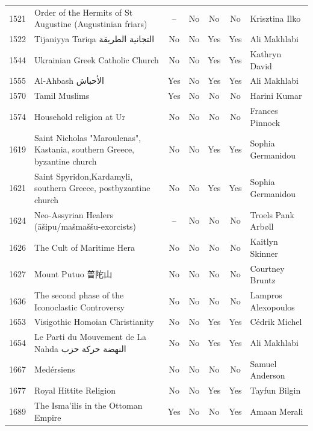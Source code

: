 {\begin{longtable}{rp{3.5cm}ccccp{3cm}}
1521 & {\raggedright Order of the Hermits of St Augustine (Augustinian friars)} & -- & No & No & No & {\raggedright Krisztina Ilko} \\
1522 & {\raggedright Tijaniyya Tariqa {\arabicfont التجانية الطريقة}} & No & No & Yes & Yes & {\raggedright Ali Makhlabi} \\
1544 & {\raggedright Ukrainian Greek Catholic Church} & No & No & Yes & Yes & {\raggedright Kathryn David} \\
1555 & {\raggedright Al-Ahbash {\arabicfont الأحباش}} & Yes & No & Yes & Yes & {\raggedright Ali Makhlabi} \\
1570 & {\raggedright Tamil Muslims} & Yes & No & No & No & {\raggedright Harini Kumar} \\
1574 & {\raggedright Household religion at Ur} & No & No & No & No & {\raggedright Frances Pinnock} \\
1619 & {\raggedright Saint Nicholas "Maroulenas", Kastania, southern Greece, byzantine church} & No & No & Yes & Yes & {\raggedright Sophia Germanidou} \\
1621 & {\raggedright Saint Spyridon,Kardamyli, southern Greece, postbyzantine church} & No & No & Yes & Yes & {\raggedright Sophia Germanidou} \\
1624 & {\raggedright Neo-Assyrian Healers (āšipu/mašmaššu-exorcists)} & -- & No & No & No & {\raggedright Troels Pank Arbøll} \\
1626 & {\raggedright The Cult of Maritime Hera} & No & No & No & No & {\raggedright Kaitlyn Skinner} \\
1627 & {\raggedright Mount Putuo 普陀山} & No & No & No & No & {\raggedright Courtney Bruntz} \\
1636 & {\raggedright The second phase of the Iconoclastic Controversy} & No & No & No & No & {\raggedright Lampros Alexopoulos} \\
1653 & {\raggedright Visigothic Homoian Christianity} & No & No & Yes & Yes & {\raggedright Cédrik Michel} \\
1654 & {\raggedright Le Parti du Mouvement de La Nahda {\arabicfont النهضة حركة حزب}} & No & No & Yes & Yes & {\raggedright Ali Makhlabi} \\
1667 & {\raggedright Medérsiens} & No & No & No & No & {\raggedright Samuel Anderson} \\
1677 & {\raggedright Royal Hittite Religion} & No & No & Yes & Yes & {\raggedright Tayfun Bilgin} \\
1689 & {\raggedright The Isma'ilis in the Ottoman Empire} & Yes & No & No & Yes & {\raggedright Amaan Merali} \\

\end{longtable}}
